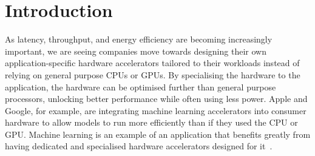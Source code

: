 \chapter{Introduction}%
\label{sec:introduction}




As latency, throughput, and energy efficiency are becoming increasingly
important, we are seeing companies move towards designing their own
application-specific hardware accelerators tailored to their workloads instead
of relying on general purpose \glspl{CPU} or \glspl{GPU}.  By specialising the
hardware to the application, the hardware can be optimised further than general
purpose processors, unlocking better performance while often using less power.
Apple and Google, for example, are integrating machine learning accelerators
into consumer hardware to allow models to run more efficiently than if they used
the \gls{CPU} or \gls{GPU}.  Machine learning is an example of an application
that benefits greatly from having dedicated and specialised hardware
accelerators designed for it~\cite{reuther20_survey_machin_learn_accel}.

